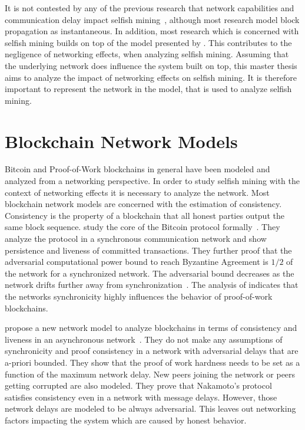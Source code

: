 It is not contested by any of the previous research that network capabilities and communication delay impact selfish mining~\cite{multi_sm}, although most research model block propagation as instantaneous.
In addition, most research which is concerned with selfish mining builds on top of the model presented by \citeauthor{optimal_sm}.
This contributes to the negligence of networking effects, when analyzing selfish mining.
Assuming that the underlying network does influence the system built on top, this master thesis aims to analyze the impact of networking effects on selfish mining. It is therefore important to represent the network in the model, that is used to analyze selfish mining.

\section{Blockchain Network Models}
Bitcoin and Proof-of-Work blockchains in general have been modeled and analyzed from a networking perspective. In order to study selfish mining with the context of networking effects it is necessary to analyze the network. 
Most blockchain network models are concerned with the estimation of consistency. Consistency is the property of a blockchain that all honest parties output the same block sequence.
\citeauthor{garay2015bitcoin} study the core of the Bitcoin protocol formally~\cite{garay2015bitcoin}. They analyze the protocol in a synchronous communication network and show persistence and liveness of committed transactions. They further proof that the adversarial computational power bound to reach Byzantine Agreement is $1/2$ of the network for a synchronized network. The adversarial bound decreases as the network drifts further away from synchronization~\cite{garay2015bitcoin}.
The analysis of \citeauthor{garay2015bitcoin} indicates that the networks synchronicity highly influences the behavior of proof-of-work blockchains.

\citeauthor{pass2017analysis} propose a new network model to analyze blockchains in terms of consistency and liveness in an asynchronous network~\cite{pass2017analysis}. They do not make any assumptions of synchronicity and proof consistency in a network with adversarial delays that are a-priori bounded. They show that the proof of work hardness needs to be set as a function of the maximum network delay. New peers joining the network or peers getting corrupted are also modeled. They prove that Nakamoto's protocol satisfies consistency even in a network with message delays. However, those network delays are modeled to be always adversarial. This leaves out networking factors impacting the system which are caused by honest behavior.

